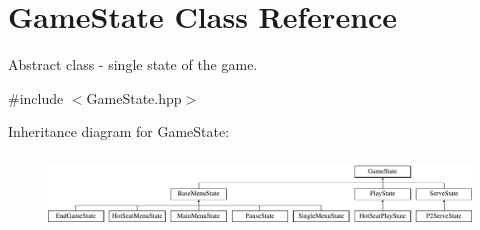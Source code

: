 \hypertarget{class_game_state}{}\section{Game\+State Class Reference}
\label{class_game_state}


Abstract class -\/ single state of the game.  




{\ttfamily \#include $<$Game\+State.\+hpp$>$}

Inheritance diagram for Game\+State\+:\begin{figure}[H]
\begin{center}
\leavevmode
\includegraphics[height=1.935484cm]{class_game_state}
\end{center}
\end{figure}
